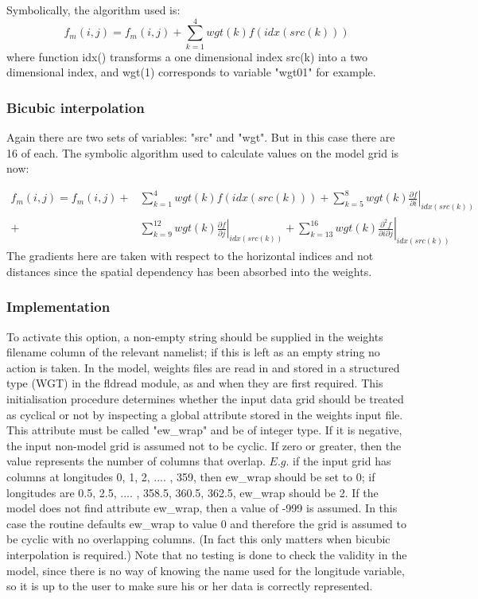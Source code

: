 \documentclass[../main/NEMO_manual]{subfiles}
\begin{document}
Symbolically, the algorithm used is:
\[
  f_{m}(i,j) = f_{m}(i,j) + \sum_{k=1}^{4} {wgt(k)f(idx(src(k)))}
\]
where function idx() transforms a one dimensional index src(k) into a two dimensional index,
and wgt(1) corresponds to variable "wgt01" for example.

\subsubsection{Bicubic interpolation}
\label{subsec:SBC_iof_bicubic}

Again there are two sets of variables: "src" and "wgt".
But in this case there are 16 of each.
The symbolic algorithm used to calculate values on the model grid is now:

\[
  \begin{split}
    f_{m}(i,j) =  f_{m}(i,j) +& \sum_{k=1}^{4} {wgt(k)f(idx(src(k)))}
    +   \sum_{k=5}^{8} {wgt(k)\left.\frac{\partial f}{\partial i}\right| _{idx(src(k))} }    \\
    +& \sum_{k=9}^{12} {wgt(k)\left.\frac{\partial f}{\partial j}\right| _{idx(src(k))} }
    +   \sum_{k=13}^{16} {wgt(k)\left.\frac{\partial ^2 f}{\partial i \partial j}\right| _{idx(src(k))} }
  \end{split}
\]
The gradients here are taken with respect to the horizontal indices and not distances since
the spatial dependency has been absorbed into the weights.

\subsubsection{Implementation}
\label{subsec:SBC_iof_imp}

To activate this option, a non-empty string should be supplied in
the weights filename column of the relevant namelist;
if this is left as an empty string no action is taken.
In the model, weights files are read in and stored in a structured type (WGT) in the fldread module,
as and when they are first required.
This initialisation procedure determines whether the input data grid should be treated as cyclical or not by
inspecting a global attribute stored in the weights input file.
This attribute must be called "ew\_wrap" and be of integer type.
If it is negative, the input non-model grid is assumed not to be cyclic.
If zero or greater, then the value represents the number of columns that overlap.
$E.g.$ if the input grid has columns at longitudes 0, 1, 2, .... , 359, then ew\_wrap should be set to 0;
if longitudes are 0.5, 2.5, .... , 358.5, 360.5, 362.5, ew\_wrap should be 2.
If the model does not find attribute ew\_wrap, then a value of -999 is assumed.
In this case the  routine defaults ew\_wrap to value 0 and
therefore the grid is assumed to be cyclic with no overlapping columns.
(In fact this only matters when bicubic interpolation is required.)
Note that no testing is done to check the validity in the model,
since there is no way of knowing the name used for the longitude variable,
so it is up to the user to make sure his or her data is correctly represented.
\end{document}
